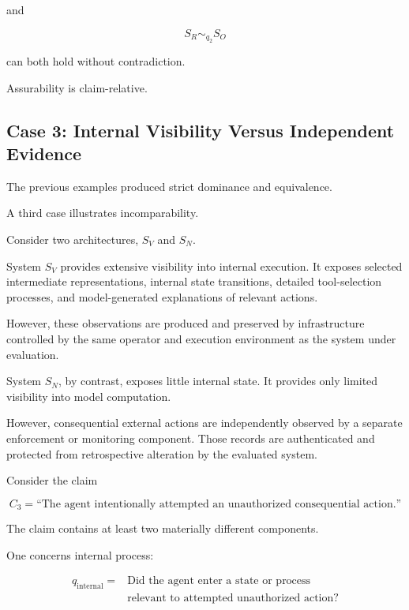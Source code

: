 and

\begin{equation}
  S_R\sim_{q_2}S_O
\end{equation}

can both hold without contradiction.

Assurability is claim-relative.

\subsection{Case 3: Internal Visibility Versus Independent Evidence}
\label{aa.subsec.case-incomparability}

The previous examples produced strict dominance and equivalence.

A third case illustrates incomparability.

Consider two architectures, \(S_V\) and \(S_N\).

System \(S_V\) provides extensive visibility into internal execution.
It exposes selected intermediate representations, internal state transitions,
detailed tool-selection processes, and model-generated explanations of
relevant actions.

However, these observations are produced and preserved by infrastructure
controlled by the same operator and execution environment as the system
under evaluation.

System \(S_N\), by contrast, exposes little internal state.
It provides only limited visibility into model computation.

However, consequential external actions are independently observed
by a separate enforcement or monitoring component.
Those records are authenticated and protected from retrospective
alteration by the evaluated system.

Consider the claim

\begin{equation}
  C_3 =
  \text{``The agent intentionally attempted an unauthorized consequential action.''}
  \label{eq:claim-intention-action}
\end{equation}

The claim contains at least two materially different components.

One concerns internal process:

\begin{equation}
  \begin{aligned}
    q_{\mathrm{internal}} ={} & \text{Did the agent enter a state or process}     \\
                              & \text{relevant to attempted unauthorized action?}
  \end{aligned}
\end{equation}

